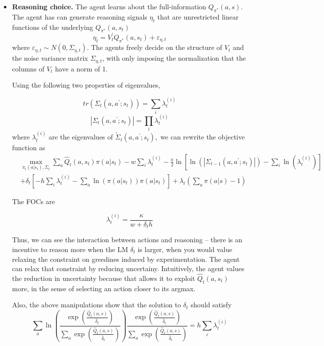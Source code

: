 \documentclass[12pt]{article}%
\begin{document}
\begin{itemize}


\item \textbf{Reasoning choice.} The agent learns about the full-information
$Q_{\pi^{\ast}}(a, s).$  The agent has can generate reasoning signals
$\eta_{t}$ that are unrestricted linear functions of the underlying
$Q_{\pi^{*}}(a,s_{t})$
\[
\eta_{t} = V_{t}^{\prime}Q_{\pi^{*}}(a,s_{t}) + \varepsilon_{\eta,t}
\]
where $\varepsilon_{\eta,t} \sim N( 0, \Sigma_{\eta,t})$. The agents freely
decide on the structure of $V_{t}$ and the noise variance matrix $\Sigma
_{\eta,t}$, with only imposing the normalization that the columns of $V_{t}$
have a norm of 1.

Using the following two properties of eigenvalues,%

\[
tr(\Sigma_{t}(a,a^{\prime}; s_{t})) = \sum_{i} \lambda_{t}^{(i)}
\]
%
\[
|\Sigma_{t}(a,a^{\prime}; s_{t})| = \prod_{i} \lambda_{t}^{(i)}
\]
where $\lambda_{t}^{(i)}$ are the eigenvalues of $\widetilde\Sigma
_{t}(a,a^{\prime}; s_{t}),$ we can rewrite the objective function as
\begin{align*}
&  \max_{\pi_{t}(a|s_{t}), \Sigma_{t}}\sum_{a}\widehat{Q}_{t} (a,s_{t}%
)\pi(a|s_{t})-w\sum_{i} \lambda_{t}^{(i)} - \frac{\kappa}{2}\ln\left[
\ln(|\Sigma_{t-1}(a,a^{\prime};s_{t})|) - \sum_{i} \ln( \lambda_{t}^{(i)})
\right] \\
&  +\delta_{t}\left[  -h\sum_{i} \lambda_{t}^{(i)} -\sum_{a}\ln(\pi
(a|s_{t}))\pi(a|s_{t})\right]  +\lambda_{t}(\sum_{a}\pi(a|s)-1)
\end{align*}


The FOCs are%

\[
\lambda_{t}^{(i)} = \frac{\kappa}{w + \delta_{t} h}%
\]


Thus, we can see the interaction between actions and reasoning -- there is an
incentive to reason more when the LM $\delta_{t}$ is larger, when you would
value relaxing the  constraint on greedines induced by experimentation. The
agent can relax that  constraint by reducing uncertainy. Intuitively, the
agent values the reduction in uncertainty because that allows it to exploit
$\widehat Q_{t}(a,s_{t})$ more, in the sense of selecting an action closer to
its argmax.

Also, the above manipulations show that the solution to $\delta_{t}$ should
satisfy
\[
\sum_{a}\ln(\frac{\exp(\frac{\widehat{Q}_{t}(a,s)}{\widehat{\delta}_{t}}
)}{\sum_{a}\exp(\frac{\widehat{Q}_{t}(a,s)}{\widehat{\delta}_{t}})})\frac
{\exp(\frac{\widehat{Q}_{t}(a,s)}{\widehat{\delta}_{t}})}{\sum_{a}\exp
(\frac{\widehat{Q}_{t}(a,s)}{\widehat{\delta}_{t}})}= h \sum_{i} \lambda
_{t}^{(i)}
\]



\end{itemize}
\end{document}
